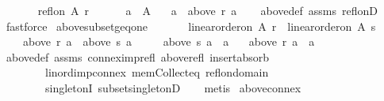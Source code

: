 \begin{isabellebody}
\ \ \isanewline
\ \ \ \ {\isachardoublequoteopen}refl{\isacharunderscore}{\kern0pt}on\ A\ r{\isachardoublequoteclose}\ \isanewline
\ \ \ \ \ {\isachardoublequoteopen}a\ {\isasymin}\ A{\isachardoublequoteclose}\isanewline
\ \ \ {\isachardoublequoteopen}a\ {\isasymin}\ above\ r\ a{\isachardoublequoteclose}\isanewline
%
\isadelimproof
\ \ %
\endisadelimproof
%
\isatagproof
{}\isamarkupfalse%
\ above{\isacharunderscore}{\kern0pt}def\ assms\ refl{\isacharunderscore}{\kern0pt}onD\isanewline
\ \ \isamarkupfalse%
\ fastforce%
\endisatagproof
{\isafoldproof}%
%
\isadelimproof
\isanewline
%
\endisadelimproof
\isanewline
{}\isamarkupfalse%
\ above{\isacharunderscore}{\kern0pt}subset{\isacharunderscore}{\kern0pt}geq{\isacharunderscore}{\kern0pt}one{\isacharcolon}{\kern0pt}\isanewline
\ \ \isanewline
\ \ \ \ {\isachardoublequoteopen}linear{\isacharunderscore}{\kern0pt}order{\isacharunderscore}{\kern0pt}on\ A\ r\ {\isasymand}\ linear{\isacharunderscore}{\kern0pt}order{\isacharunderscore}{\kern0pt}on\ A\ s{\isachardoublequoteclose}\ \isanewline
\ \ \ \ {\isachardoublequoteopen}above\ r\ a\ {\isasymsubseteq}\ above\ s\ a{\isachardoublequoteclose}\ \isanewline
\ \ \ \ {\isachardoublequoteopen}above\ s\ a\ {\isacharequal}{\kern0pt}\ {\isacharbraceleft}{\kern0pt}a{\isacharbraceright}{\kern0pt}{\isachardoublequoteclose}\isanewline
\ \ \ {\isachardoublequoteopen}above\ r\ a\ {\isacharequal}{\kern0pt}\ {\isacharbraceleft}{\kern0pt}a{\isacharbraceright}{\kern0pt}{\isachardoublequoteclose}\isanewline
%
\isadelimproof
\ \ %
\endisadelimproof
%
\isatagproof
{}\isamarkupfalse%
\ above{\isacharunderscore}{\kern0pt}def\ assms\ connex{\isacharunderscore}{\kern0pt}imp{\isacharunderscore}{\kern0pt}refl\ above{\isacharunderscore}{\kern0pt}refl\ insert{\isacharunderscore}{\kern0pt}absorb\isanewline
\ \ \ \ \ \ \ \ lin{\isacharunderscore}{\kern0pt}ord{\isacharunderscore}{\kern0pt}imp{\isacharunderscore}{\kern0pt}connex\ mem{\isacharunderscore}{\kern0pt}Collect{\isacharunderscore}{\kern0pt}eq\ refl{\isacharunderscore}{\kern0pt}on{\isacharunderscore}{\kern0pt}domain\isanewline
\ \ \ \ \ \ \ \ singletonI\ subset{\isacharunderscore}{\kern0pt}singletonD\isanewline
\ \ \isamarkupfalse%
\ metis%
\endisatagproof
{\isafoldproof}%
%
\isadelimproof
\isanewline
%
\endisadelimproof
\isanewline
{}\isamarkupfalse%
\ above{\isacharunderscore}{\kern0pt}connex{\isacharcolon}{\kern0pt}\isanewline

\end{isabellebody}
